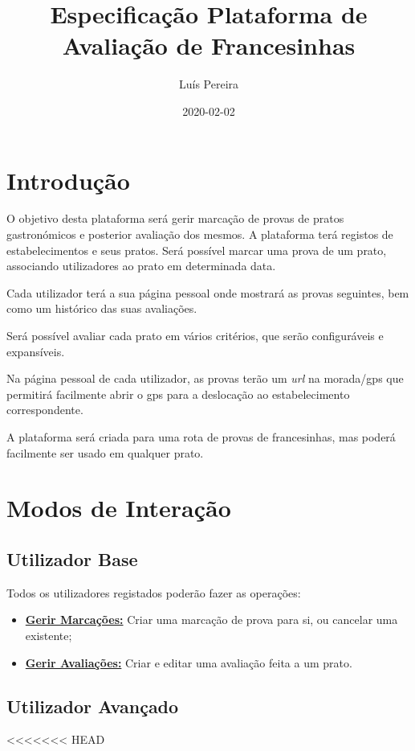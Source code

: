 \documentclass[11pt, a4paper, sans]{article}
\title{Especificação Plataforma de Avaliação de Francesinhas}
\date{2020-02-02}
\author{Luís Pereira}
\begin{document}
	\maketitle
	\newpage
	
	\tableofcontents
	\newpage

	\section{Introdução}
	
	O objetivo desta plataforma será gerir marcação de provas de pratos gastronómicos e posterior
	avaliação dos mesmos. A plataforma terá registos de estabelecimentos e seus pratos. Será possível marcar
	uma prova de um prato, associando utilizadores ao prato em determinada data. 

	Cada utilizador terá a sua página pessoal onde mostrará as provas seguintes, bem como um histórico das 
	suas avaliações.

	Será possível avaliar cada prato em vários critérios, que serão configuráveis e expansíveis.

	Na página pessoal de cada utilizador, as provas terão um \textit{url} na morada/gps que permitirá 
	facilmente abrir o gps para a deslocação ao estabelecimento correspondente.

	A plataforma será criada para uma rota de provas de francesinhas, mas poderá facilmente ser 
	usado em qualquer prato.

	\section{Modos de Interação}

	\subsection{Utilizador Base}

	Todos os utilizadores registados poderão fazer as operações:

	\begin{itemize}
		\item \underline{\textbf{Gerir Marcações:}} Criar uma marcação de prova para si, ou cancelar uma existente;
		\item \underline{\textbf{Gerir Avaliações:}} Criar e editar uma avaliação feita a um prato.
	\end{itemize}

	\subsection{Utilizador Avançado}
<<<<<<< HEAD
\end{document}
